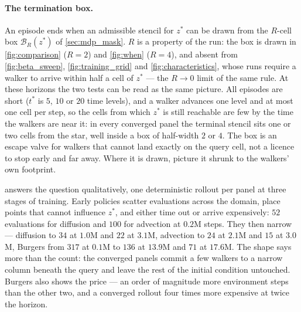 


\paragraph{The termination box.}
An episode ends when an admissible stencil for $z^{*}$ can be drawn from the
$R$-cell box $\mathcal{B}_R(z^{*})$ of \cref{sec:mdp_mask}. $R$ is a property of
the run: the box is drawn in \cref{fig:comparison} ($R=2$) and \cref{fig:when}
($R=4$), and absent from \cref{fig:beta_sweep}, \cref{fig:training_grid} and
\cref{fig:characteristics}, whose runs require a walker to arrive within half a
cell of $z^{*}$ --- the $R \to 0$ limit of the same rule. At these horizons the
two tests can be read as the same picture. All episodes are short ($t^{*}$ is
$5$, $10$ or $20$ time levels), and a walker advances one level and at most one
cell per step, so the cells from which $z^{*}$ is still reachable are few by the
time the walkers are near it: in every converged panel the terminal stencil sits
one or two cells from the star, well inside a box of half-width $2$ or $4$. The
box is an escape valve for walkers that cannot land exactly on the query cell,
not a licence to stop early and far away. Where it is drawn, picture it shrunk to
the walkers' own footprint.



 answers the question qualitatively, one deterministic
rollout per panel at three stages of training. Early policies scatter
evaluations across the domain, place points that cannot influence $z^{*}$, and
either time out or arrive expensively: $52$ evaluations for diffusion and $100$
for advection at $0.2$M steps. They then narrow --- diffusion to $34$ at $1.0$M
and $22$ at $3.1$M, advection to $24$ at $2.1$M and $15$ at $3.0$M, Burgers from
$317$ at $0.1$M to $136$ at $13.9$M and $71$ at $17.6$M. The shape says more than
the count: the converged panels commit a few walkers to a narrow column beneath
the query and leave the rest of the initial condition untouched. Burgers also
shows the price --- an order of magnitude more environment steps than the other
two, and a converged rollout four times more expensive at twice the horizon.

